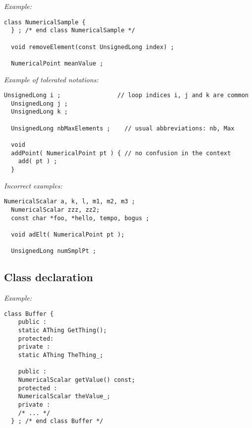 
\emph{Example:}
\begin{lstlisting}[frame=TBRL]
  class NumericalSample {
  } ; /* end class NumericalSample */

  void removeElement(const UnsignedLong index) ;

  NumericalPoint meanValue ;
\end{lstlisting}

\emph{Example of tolerated notations:}
\begin{lstlisting}[frame=TBRL]
  UnsignedLong i ;                // loop indices i, j and k are common
  UnsignedLong j ;
  UnsignedLong k ;

  UnsignedLong nbMaxElements ;    // usual abbreviations: nb, Max

  void
  addPoint( NumericalPoint pt ) { // no confusion in the context
    add( pt ) ;
  }
\end{lstlisting}

\emph{Incorrect examples:}
\begin{lstlisting}[frame=TBRL]
  NumericalScalar a, k, l, m1, m2, m3 ;
  NumericalScalar zzz, zz2;
  const char *foo, *hello, tempo, bogus ;

  void adElt( NumericalPoint pt );

  UnsignedLong numSmplPt ;
\end{lstlisting}

\subsection{Class declaration}

\emph{Example:}
\lstset{language=C++, basicstyle=\normalsize}
\begin{lstlisting}[frame=TBRL]
  class Buffer {
    public :
    static AThing GetThing();
    protected:
    private :
    static AThing TheThing_;

    public :
    NumericalScalar getValue() const;
    protected :
    NumericalScalar theValue_;
    private :
    /* ... */
  } ; /* end class Buffer */
\end{lstlisting}


